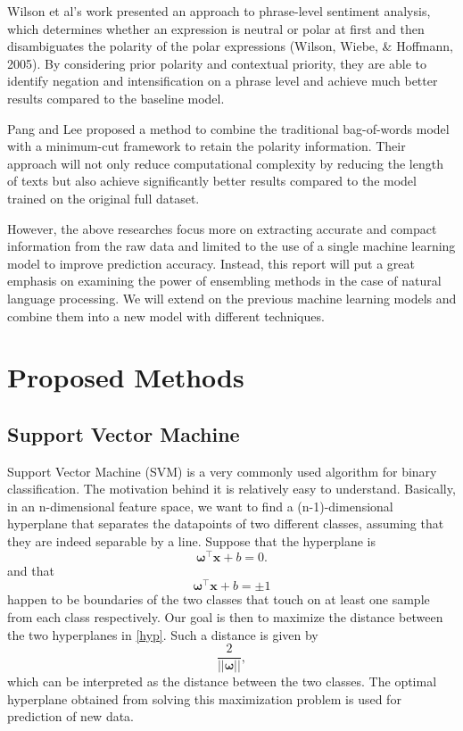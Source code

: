 \documentclass[10pt,twocolumn]{article}
\begin{document}
	Wilson et al’s work presented an approach to phrase-level sentiment analysis, which determines whether an expression is neutral or polar at first and then disambiguates the polarity of the polar expressions (Wilson, Wiebe, \& Hoffmann, 2005)\cite{wilson-etal-2005-recognizing}.  By considering prior polarity and contextual priority, they are able to identify negation and intensification on a phrase level and achieve much better results compared to the baseline model.
	
	Pang and Lee proposed a method to combine the traditional bag-of-words model with a minimum-cut framework to retain the polarity information\cite{DBLP:journals/corr/cs-CL-0409058}. Their approach will not only reduce computational complexity by reducing the length of texts but also achieve significantly better results compared to the model trained on the original full dataset. 
	
	However, the above researches focus more on extracting accurate and compact information from the raw data and limited to the use of a single machine learning model to improve prediction accuracy. Instead, this report will put a great emphasis on examining the power of ensembling methods in the case of natural language processing. We will extend on the previous machine learning models and combine them into a new model with different techniques.
	\section{Proposed Methods}
	\subsection{Support Vector Machine}
	Support Vector Machine (SVM) is a very commonly used algorithm for binary classification. The motivation behind it is relatively easy to understand. Basically, in an n-dimensional feature space, we want to find a (n-1)-dimensional hyperplane that separates the datapoints of two different classes, assuming that they are indeed separable by a line. Suppose that the hyperplane is $$\bm{\omega}^\top \bm{x} + b = 0.$$ and that \begin{equation}
	\bm{\omega}^\top \bm{x} + b = \pm1 \label{hyp}
	\end{equation} happen to be boundaries of the two classes that touch on at least one sample from each class respectively. Our goal is then to maximize the distance between the two hyperplanes in \ref{hyp}. Such a distance is given by $$\frac{2}{||\bm{\omega}||},$$ which can be interpreted as the distance between the two classes. The optimal hyperplane obtained from solving this maximization problem is used for prediction of new data. 
	
\end{document}
